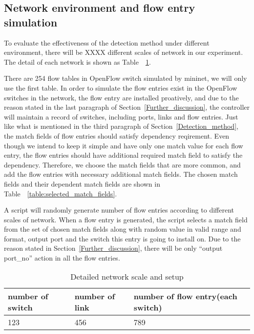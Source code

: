 \subsection{Network environment and flow entry simulation} 
To evaluate the effectiveness of the detection method under different environment, there will be XXXX different scales of network in our experiment. The detail of each network is shown as Table~~\ref{table:network_env}. 

There are 254 flow tables in OpenFlow switch simulated by mininet, we will only use the first table. In order to simulate the flow entries exist in the OpenFlow switches in the network, the flow entry are installed proatively, and due to the reason stated in the last paragraph of Section~\ref{Further_discussion}, the controller will maintain a record of switches, including ports, links and flow entries. Just like what is mentioned in the third paragraph of Section~\ref{Detection_method}, the match fields of flow entries should satisfy dependency reqirement. Even though we intend to keep it simple and have only one match value for each flow entry, the flow entries should have additional required match field to satisfy the dependency. Therefore, we choose the match fields that are more common, and add the flow entries with necessary additional match fields. The chosen match fields and their dependent match fields are shown in Table~~\ref{table:selected_match_fields}.

A script will randomly generate number of flow entries according to different scales of network.
When a flow entry is generated, the script selects a match field from the set of chosen match fields along with random value in valid range and format, output port and the switch this entry is going to install on. Due to the reason stated in Section~\ref{Further_discussion}, there will be only ``output port\_no'' action in all the flow entries.

\begin{table}[H]
\centering
\caption{Detailed network scale and setup}
\begin{tabular}{|l|p{4cm}|p{4.5cm}|}
\hline  number of switch & number of link & number of flow entry(each switch) \\
\hline 123 & 456 & 789	\\
\hline 
\end{tabular}
\label{table:network_env}
\end{table}

